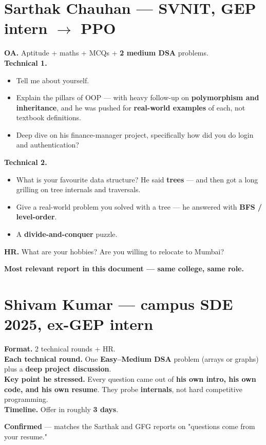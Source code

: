 \documentclass[11pt,a4paper]{article}
\newcommand{\tg}[1]{\textcolor{tag}{\textbf{\footnotesize #1}}}
\newcommand{\rnd}[1]{\textcolor{accent}{\textbf{#1}}}
\newcommand{\q}[1]{\textcolor{qcol}{#1}}
\newcommand{\card}[1]{%
  \par\vspace{5pt}%
  \noindent\colorbox{soft}{%
    \parbox{\dimexpr\textwidth-2\fboxsep}{\vspace{6pt}#1\vspace{6pt}}%
  }\par\vspace{7pt}%
}
\begin{document}
\section{Sarthak Chauhan --- SVNIT, GEP intern $\rightarrow$ PPO}
\card{
\rnd{OA.} Aptitude + maths + MCQs + \textbf{2 medium DSA} problems.\\[5pt]
\rnd{Technical 1.}
\begin{itemize}
  \item \q{Tell me about yourself.}
  \item \q{Explain the pillars of OOP} --- with heavy follow-up on \textbf{polymorphism and inheritance}, and he was pushed for \textbf{real-world examples} of each, not textbook definitions.
  \item Deep dive on his finance-manager project, specifically \q{how did you do login and authentication?}
\end{itemize}
\vspace{3pt}
\rnd{Technical 2.}
\begin{itemize}
  \item \q{What is your favourite data structure?} He said \textbf{trees} --- and then got a long grilling on tree internals and traversals.
  \item \q{Give a real-world problem you solved with a tree} --- he answered with \textbf{BFS / level-order}.
  \item A \textbf{divide-and-conquer} puzzle.
\end{itemize}
\vspace{3pt}
\rnd{HR.} \q{What are your hobbies?} \quad \q{Are you willing to relocate to Mumbai?}
}
\tg{Most relevant report in this document --- same college, same role.}

\section{Shivam Kumar --- campus SDE 2025, ex-GEP intern}
\card{
\rnd{Format.} 2 technical rounds + HR.\\[4pt]
\rnd{Each technical round.} One \textbf{Easy--Medium DSA} problem (arrays or graphs) plus a \textbf{deep project discussion}.\\[4pt]
\rnd{Key point he stressed.} Every question came out of \textbf{his own intro, his own code, and his own resume}. They probe \textbf{internals}, not hard competitive programming.\\[4pt]
\rnd{Timeline.} Offer in roughly \textbf{3 days}.
}
\tg{Confirmed} --- matches the Sarthak and GFG reports on "questions come from your resume."
\end{document}
